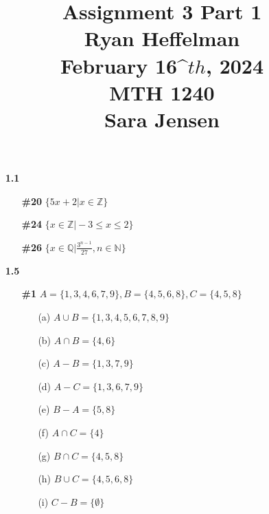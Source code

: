\documentclass[16pt]{article}
\begin{document}
\large
\date{}
\title{\Large Assignment 3 Part 1 \\ Ryan Heffelman \\ February 16^\(th\), 2024 \\ MTH 1240 \\ Sara Jensen}
\maketitle
\begin{enumerate}
    \item[\textbf{1.1}]
    \item[]
    \begin{enumerate}
        \item[\textbf{\#20}] $\{5x + 2 \vert x \in \mathbb{Z}\}$
        \item[\textbf{\#24}] $\{x \in \mathbb{Z} \vert -3 \leq x \leq 2\}$
        \item[\textbf{\#26}] $\{x \in \mathbb{Q} \vert \frac{3^{n-1}}{27}, n \in \mathbb{N}\}$
    \end{enumerate}
    \item[\textbf{1.5}]
    \item[]
    \begin{enumerate}
        \item[\textbf{\#1}] $A = \{1, 3, 4, 6, 7, 9\}, B = \{4, 5, 6, 8\}, C = \{4, 5, 8\}$
        \item[]
        \begin{enumerate}
            \item[(a)] $A \cup B = \{1, 3, 4, 5, 6, 7, 8, 9\}$
            \item[(b)] $A \cap B = \{4, 6\}$
            \item[(c)] $A - B = \{1, 3, 7, 9\}$
            \item[(d)] $A - C = \{1, 3, 6, 7, 9\}$
            \item[(e)] $B - A = \{5, 8\}$
            \item[(f)] $A \cap C = \{4\}$
            \item[(g)] $B \cap C = \{4, 5, 8\}$
            \item[(h)] $B \cup C = \{4, 5, 6, 8\}$
            \item[(i)] $C - B = \{\emptyset\}$
        \end{enumerate}
    \end{enumerate}
\end{enumerate}
\end{document}
